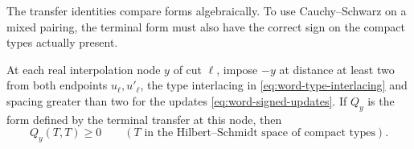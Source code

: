 The transfer identities compare forms algebraically. To use Cauchy--Schwarz on a mixed pairing, the terminal form must also have the correct sign on the compact types actually present.

\begin{proposition}\label{prop:real-node-positivity}
At each real interpolation node \(y\) of cut \(\ell\), impose
\(-y\) at distance at least two from both endpoints
\(u_\ell,u'_\ell\), the type interlacing in \eqref{eq:word-type-interlacing}
and spacing greater than two for the updates \eqref{eq:word-signed-updates}.
If \(Q_y\) is the form defined by the terminal transfer at this node, then 
\[
 Q_y(T,T)\ge0\qquad(T\text{ in the Hilbert--Schmidt space of compact types}).
\]

\end{proposition}


